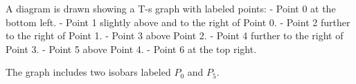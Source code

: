 A diagram is drawn showing a T-s graph with labeled points:  
- Point 0 at the bottom left.  
- Point 1 slightly above and to the right of Point 0.  
- Point 2 further to the right of Point 1.  
- Point 3 above Point 2.  
- Point 4 further to the right of Point 3.  
- Point 5 above Point 4.  
- Point 6 at the top right.  

The graph includes two isobars labeled \( P_0 \) and \( P_5 \).